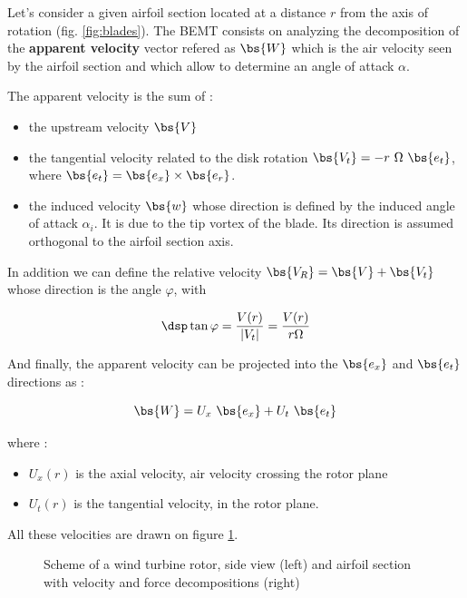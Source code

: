 Let's consider a given airfoil section located at a distance $r$ from the axis of rotation (fig. \ref{fig:blades}). 
The BEMT consists on analyzing the decomposition of the \textbf{apparent velocity} vector refered as $\bs{W}$ 
which is the air velocity seen by the airfoil section and
which allow to determine an angle of attack $\alpha$.

The apparent velocity is the sum of :
\begin{itemize}
\item the upstream  velocity $\bs{V}$

\item the tangential velocity related to the disk rotation $\bs{V_t} = - r~\Omega~\bs{e_t}$,
 where $\bs{e_t} = \bs{e_x} \times \bs{e_r}$. 

\item the induced velocity $\bs{w}$ whose direction is defined by the induced angle of attack $\alpha_i$. 
It is due to the tip vortex of the blade. Its direction is assumed orthogonal to the airfoil section axis.   
\end{itemize}


In addition we can define the relative velocity $\bs{V_R} = \bs{V} + \bs{V_t}$ whose direction is the angle $\varphi$, with 

$$ \dsp \tan\varphi = \frac{V(r)}{|V_t|} = \frac{V(r)}{r\Omega}$$

And finally, the apparent velocity can be projected into the $\bs{e_x}$ and $\bs{e_t}$ directions as :

\begin{equation}
 \bs{W} = U_x~\bs{e_x} + U_t~\bs{e_t}
\label{eq:W_def}
\end{equation} 

where :
\begin{itemize}
  \item $U_x(r)$ is the axial velocity, air velocity crossing the rotor plane
  \item $U_t(r)$ is the tangential velocity, in the rotor plane. 
\end{itemize}

All these velocities are drawn on figure  \ref{fig:rotor_side_notations}.

\begin{figure}[htb]
  \begin{center}
  
  \caption{Scheme of a wind turbine rotor, side view (left) and airfoil section with velocity and force decompositions (right)}
  \label{fig:rotor_side_notations}
  \end{center}
  \end{figure}


